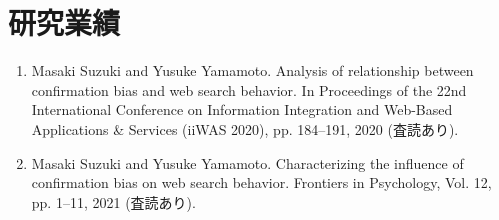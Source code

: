%
%
%
%

\section*{研究業績}
\begin{enumerate}
\item Masaki Suzuki and Yusuke Yamamoto. Analysis of relationship between confirmation bias and web search behavior. In Proceedings of the 22nd International Conference on Information Integration and Web-Based Applications \& Services (iiWAS 2020), pp. 184–191, 2020 (査読あり).
\item Masaki Suzuki and Yusuke Yamamoto. Characterizing the influence of confirmation bias on web search behavior. Frontiers in Psychology, Vol. 12, pp. 1–11, 2021 (査読あり).
\end{enumerate}
